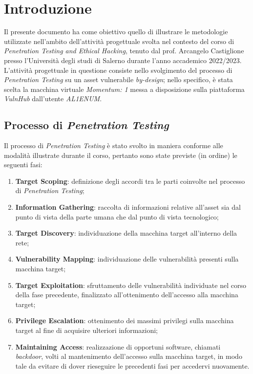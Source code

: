 \chapter{Introduzione}
Il presente documento ha come obiettivo quello di illustrare le metodologie utilizzate nell'ambito dell'attività progettuale svolta nel contesto del corso di \emph{Penetration Testing and Ethical Hacking}, tenuto dal prof. Arcangelo Castiglione presso l'Università degli studi di Salerno durante l'anno accademico 2022/2023. L'attività progettuale in questione consiste nello svolgimento del processo di \emph{Penetration Testing} su un asset vulnerabile \emph{by-design}; nello specifico, è stata scelta la macchina virtuale \emph{Momentum: 1} messa a disposizione sulla piattaforma \emph{VulnHub} dall'utente \emph{AL1ENUM}. 

\section{Processo di \emph{Penetration Testing}}
Il processo di \emph{Penetration Testing} è stato svolto in maniera conforme alle modalità illustrate durante il corso, pertanto sono state previste (in ordine) le seguenti fasi:
\begin{enumerate}
    \item \textbf{Target Scoping}: definizione degli accordi tra le parti coinvolte nel processo di \emph{Penetration Testing};
    \item \textbf{Information Gathering}: raccolta di informazioni relative all'asset sia dal punto di vista della parte umana che dal punto di vista tecnologico;
    \item \textbf{Target Discovery}: individuazione della macchina target all'interno della rete;
    \item \textbf{Vulnerability Mapping}: individuazione delle vulnerabilità presenti sulla macchina target;
    \item \textbf{Target Exploitation}: sfruttamento delle vulnerabilità individuate nel corso della fase precedente, finalizzato all'ottenimento dell'accesso alla macchina target;
    \item \textbf{Privilege Escalation}: ottenimento dei massimi privilegi sulla macchina target al fine di acquisire ulteriori informazioni;
    \item \textbf{Maintaining Access}: realizzazione di opportuni software, chiamati \emph{backdoor}, volti al mantenimento dell'accesso sulla macchina target, in modo tale da evitare di dover rieseguire le precedenti fasi per accedervi nuovamente.
\end{enumerate}

